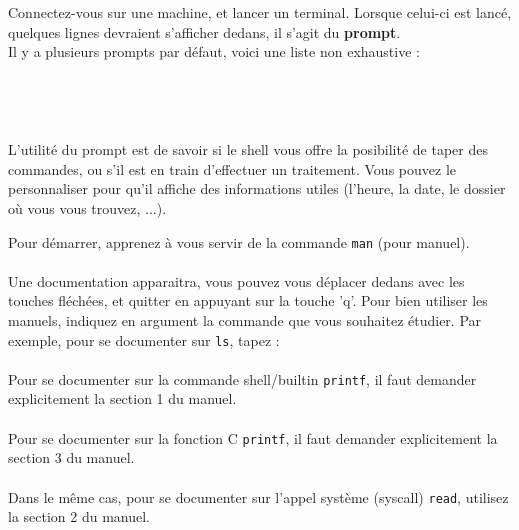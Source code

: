 Connectez-vous sur une machine, et lancer un terminal. Lorsque celui-ci est lancé, quelques lignes devraient s'afficher dedans, il s'agit du \textbf{prompt}.\\

Il y a plusieurs prompts par défaut, voici une liste non exhaustive :\\

\TTBF{\$} \\
\TTBF{\%} \\
\TTBF{>} \\
 \\

L'utilité du prompt est de savoir si le shell vous offre la posibilité de taper des commandes, ou s'il est en train d'effectuer un traitement.
Vous pouvez le personnaliser pour qu'il affiche des informations utiles (l'heure, la date, le dossier où vous vous trouvez, ...).\\

\bigskip

Pour démarrer, apprenez à vous servir de la commande \texttt{man} (pour manuel).\\

\\

Une documentation apparaitra, vous pouvez vous déplacer dedans avec les touches fléchées, et quitter en appuyant sur la touche 'q'.
Pour bien utiliser les manuels, indiquez en argument la commande que vous souhaitez étudier.
Par exemple, pour se documenter sur \texttt{ls}, tapez :\\

\\

Pour se documenter sur la commande shell/builtin \texttt{printf}, il faut demander explicitement la section 1 du manuel.\\

\\

Pour se documenter sur la fonction C \texttt{printf}, il faut demander explicitement la section 3 du manuel.\\

\\

Dans le même cas, pour se documenter sur l'appel système (syscall) \texttt{read}, utilisez la section 2 du manuel.\\

\\

